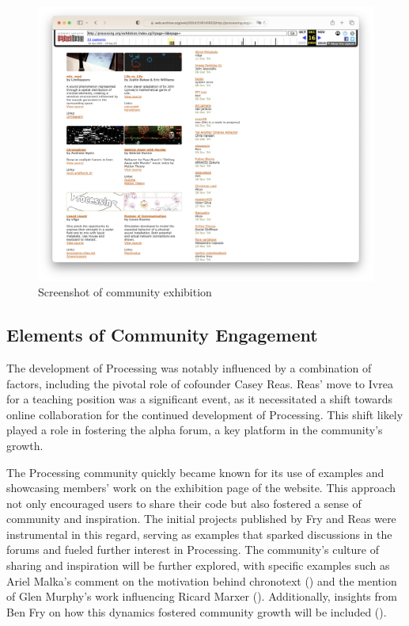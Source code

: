 \newpage
\begin{figure}
	\centering
	\includegraphics[width=1.0\textwidth]{images/exhibitions.png}
	\caption{Screenshot of community exhibition}
	\label{fig:website-exhibition}
\end{figure}

\subsection{Elements of Community Engagement}
The development of Processing was notably influenced by a combination of factors, including the pivotal role of cofounder Casey Reas. Reas' move to Ivrea for a teaching position was a significant event, as it necessitated a shift towards online collaboration for the continued development of Processing. This shift likely played a role in fostering the alpha forum, a key platform in the community's growth.

The Processing community quickly became known for its use of examples and showcasing members' work on the exhibition page of the website. This approach not only encouraged users to share their code but also fostered a sense of community and inspiration. The initial projects published by Fry and Reas were instrumental in this regard, serving as examples that sparked discussions in the forums and fueled further interest in Processing. The community's culture of sharing and inspiration will be further explored, with specific examples such as Ariel Malka's comment on the motivation behind chronotext () and the mention of Glen Murphy's work influencing Ricard Marxer (). Additionally, insights from Ben Fry on how this dynamics fostered community growth will be included ().

